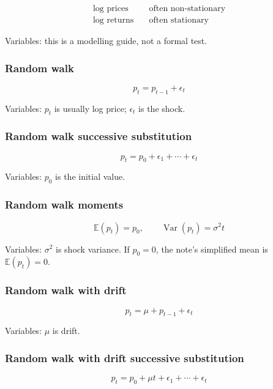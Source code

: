 \documentclass[
  8pt,
  twocolumn]{extarticle}
\begin{document}
\[
\begin{aligned}
\log\text{ prices}&\quad \text{often non-stationary}\\
\log\text{ returns}&\quad \text{often stationary}
\end{aligned}
\]

Variables: this is a modelling guide, not a formal test.

\subsubsection{Random walk}\label{random-walk}

\[
p_t=p_{t-1}+\epsilon_t
\]

Variables: \(p_t\) is usually log price; \(\epsilon_t\) is the shock.

\subsubsection{Random walk successive
substitution}\label{random-walk-successive-substitution}

\[
p_t=p_0+\epsilon_1+\cdots+\epsilon_t
\]

Variables: \(p_0\) is the initial value.

\subsubsection{Random walk moments}\label{random-walk-moments}

\[
\mathbb E(p_t)=p_0,\qquad \operatorname{Var}(p_t)=\sigma^2t
\]

Variables: \(\sigma^2\) is shock variance. If \(p_0=0\), the note's
simplified mean is \(\mathbb E(p_t)=0\).

\subsubsection{Random walk with drift}\label{random-walk-with-drift}

\[
p_t=\mu+p_{t-1}+\epsilon_t
\]

Variables: \(\mu\) is drift.

\subsubsection{Random walk with drift successive
substitution}\label{random-walk-with-drift-successive-substitution}

\[
p_t=p_0+\mu t+\epsilon_1+\cdots+\epsilon_t
\]
\end{document}
